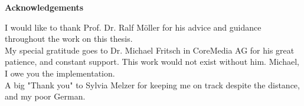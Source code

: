 \bigskip
\bigskip

\pagebreak\par
{\Large\noindent \textbf{Acknowledgements}}\\

\bigskip
\bigskip


I would like to thank Prof. Dr. Ralf M\"oller for his advice and guidance throughout the work on this thesis. \\
My special gratitude goes to Dr. Michael Fritsch in CoreMedia AG for his great patience, and constant support. This work would not exist without him. Michael, I owe you the implementation. \\
A big "Thank you" to Sylvia Melzer for keeping me on track despite the distance, and my poor German. \\


\pagebreak
